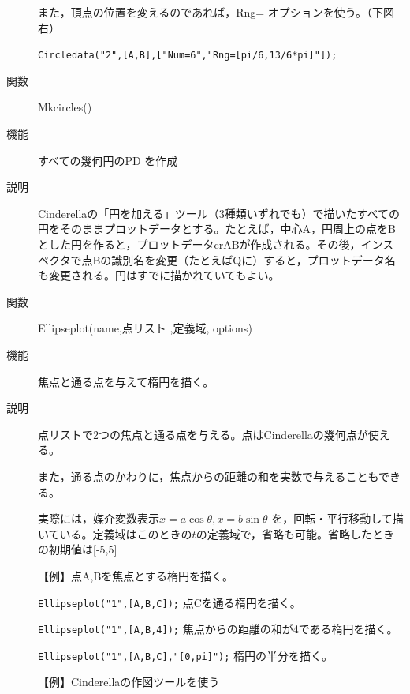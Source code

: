\documentclass[papersize,a4paper,12pt,uplatex]{jsarticle}
\begin{document}
\begin{description}
また，頂点の位置を変えるのであれば，Rng= オプションを使う。（下図右）

 \verb|Circledata("2",[A,B],["Num=6","Rng=[pi/6,13/6*pi]"]);|

\hspace{10mm} 
\hspace{5mm}  


\vspace{\baselineskip}
\hypertarget{mkcircles}{}
\item[関数]  Mkcircles()
\item[機能]  すべての幾何円のPD を作成
\item[説明]  Cinderellaの「円を加える」ツール（3種類いずれでも）で描いたすべての円をそのままプロットデータとする。たとえば，中心A，円周上の点をBとした円を作ると，プロットデータcrABが作成される。その後，インスペクタで点Bの識別名を変更（たとえばQに）すると，プロットデータ名も変更される。円はすでに描かれていてもよい。

\vspace{\baselineskip}
\hypertarget{ellipseplot}{}
\item[関数]  Ellipseplot(name,点リスト ,定義域, options)
\item[機能]  焦点と通る点を与えて楕円を描く。
\item[説明]  点リストで2つの焦点と通る点を与える。点はCinderellaの幾何点が使える。

  また，通る点のかわりに，焦点からの距離の和を実数で与えることもできる。
  
  実際には，媒介変数表示$x=a \cos \theta,x=b \sin \theta$ を，回転・平行移動して描いている。定義域はこのときの$t$の定義域で，省略も可能。省略したときの初期値は[-5,5]

\vspace{\baselineskip}
【例】点A,Bを焦点とする楕円を描く。

\verb|Ellipseplot("1",[A,B,C]);|   点Cを通る楕円を描く。

\verb|Ellipseplot("1",[A,B,4]);|   焦点からの距離の和が4である楕円を描く。

\verb|Ellipseplot("1",[A,B,C],"[0,pi]");|   楕円の半分を描く。

\vspace{\baselineskip}
【例】Cinderellaの作図ツールを使う


\end{description}
\end{document}

